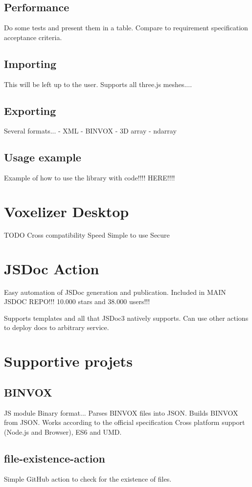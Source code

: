 \subsection{Performance}
Do some tests and present them in a table.
Compare to requirement specification acceptance criteria.

\subsection{Importing}
This will be left up to the user. Supports all three.js meshes....

\subsection{Exporting}
Several formats...
- XML
- BINVOX
- 3D array
- ndarray

\subsection{Usage example}
Example of how to use the library with code!!!! HERE!!!!

\section{Voxelizer Desktop}
TODO
Cross compatibility
Speed
Simple to use
Secure

\section{JSDoc Action}
Easy automation of JSDoc generation and publication.
Included in MAIN JSDOC REPO!!! 10.000 stars and 38.000 users!!!

Supports templates and all that JSDoc3 natively supports.
Can use other actions to deploy docs to arbitrary service.


\section{Supportive projets}
\subsection{BINVOX}
JS module
Binary format...
Parses BINVOX files into JSON.
Builds BINVOX from JSON.
Works according to the official specification
Cross platform support (Node.js and Browser), ES6 and UMD. 

\subsection{file-existence-action}
Simple GitHub action to check for the existence of files.

